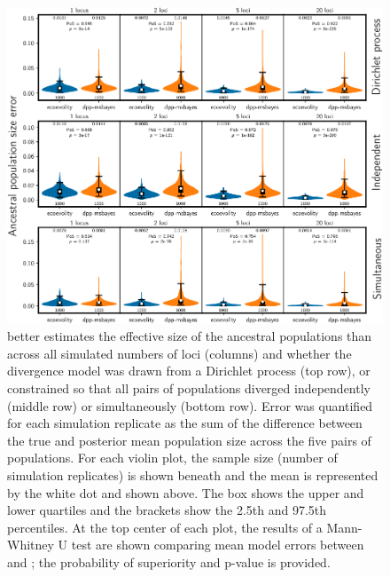 \clearpage

\begin{figure}[htbp]
    \begin{center}
        \includegraphics[width=\textwidth,height=\textheight,keepaspectratio]{../images/from-project-repo/plots/tex-plot-grids/grid-ancestral-pop-size-error-cropped.pdf}
        \caption{
            \scriptsize
            \Ecoevolity better estimates the effective size of the ancestral
            populations than \dppmsbayes across all simulated numbers of loci
            (columns) and whether the divergence model was drawn from a
            Dirichlet process (top row), or constrained so that all pairs of
            populations diverged independently (middle row) or simultaneously
            (bottom row).
            Error was quantified for each simulation replicate
            as the sum of the difference between the true and posterior mean
            population size across the five pairs of populations.
            For each violin plot, the sample size (number of simulation
            replicates) is shown beneath and the mean is represented by the
            white dot and shown above.
            The box shows the upper and lower quartiles and the brackets
            show the 2.5th and 97.5th percentiles.
            At the top center of each plot, the results of a Mann-Whitney U
            test \citep{MannWhitney1947} are shown comparing mean model errors
            between \ecoevolity and \dppmsbayes;
            the probability of superiority \citep[PoS, the probability that
            \ecoevolity has a lower mean model error than \dppmsbayes for a
            random simulation replicate drawn from
            each;][]{WolfeHogg1971,Grissom1994} and p-value is provided.
        }
        \label{fig:ancpopsizeerror}
    \end{center}
\end{figure}

